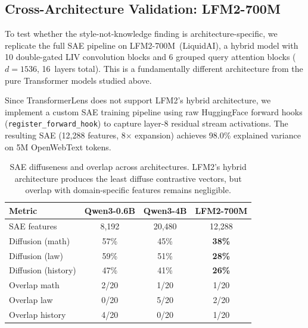 \documentclass[11pt,a4paper]{article}
\begin{document}
\subsection{Cross-Architecture Validation: LFM2-700M}
\label{sec:lfm2}

To test whether the style-not-knowledge finding is architecture-specific, we replicate the full SAE pipeline on LFM2-700M~(LiquidAI), a hybrid model with 10 double-gated LIV convolution blocks and 6 grouped query attention blocks ($d=1536$, 16~layers total). This is a fundamentally different architecture from the pure Transformer models studied above.

Since TransformerLens does not support LFM2's hybrid architecture, we implement a custom SAE training pipeline using raw HuggingFace forward hooks (\texttt{register\_forward\_hook}) to capture layer-8 residual stream activations. The resulting SAE (12{,}288 features, 8$\times$ expansion) achieves 98.0\% explained variance on 5M OpenWebText tokens.

\begin{table}[H]
\centering
\caption{SAE diffuseness and overlap across architectures. LFM2's hybrid architecture produces the least diffuse contrastive vectors, but overlap with domain-specific features remains negligible.}
\label{tab:cross_arch_sae}
\small
\begin{tabular}{lccc}
\toprule
\textbf{Metric} & \textbf{Qwen3-0.6B} & \textbf{Qwen3-4B} & \textbf{LFM2-700M} \\
\midrule
SAE features & 8{,}192 & 20{,}480 & 12{,}288 \\
Diffusion (math) & 57\% & 45\% & \textbf{38\%} \\
Diffusion (law) & 59\% & 51\% & \textbf{28\%} \\
Diffusion (history) & 47\% & 41\% & \textbf{26\%} \\
Overlap math & 2/20 & 1/20 & 1/20 \\
Overlap law & 0/20 & 5/20 & 2/20 \\
Overlap history & 4/20 & 0/20 & 1/20 \\
\bottomrule
\end{tabular}
\end{table}
\end{document}
